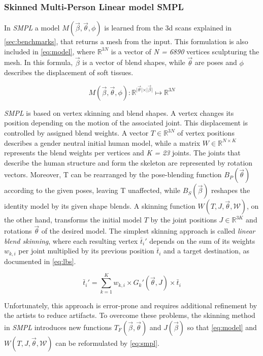 \subsubsection{Skinned Multi-Person Linear model SMPL}
In \emph{SMPL} a model $M(\vec{\beta},\vec{\theta},\phi)$ is learned from the 3d scans explained in \autoref{sec:benchmarks}, that returns a mesh from the input. This formulation is also included in \autoref{eq:model}, where $\mathbb{R}^{3N}$ is a vector of \emph{N = 6890} vertices sculpturing the mesh. In this formula, $\vec{\beta}$ is a vector of blend shapes, while $\vec{\theta}$ are poses and $\phi$ describes the displacement of soft tissues.

\begin{equation}
\label{eq:model}
M(\vec{\beta},\vec{\theta},\phi) : \mathbb{R}^{\vert \vec{\theta} \vert \times \vert \vec{\beta} \vert} \mapsto \mathbb{R}^{3N}
\end{equation}

\emph{SMPL} is based on vertex skinning and blend shapes. A vertex changes its position depending on the motion of the associated joint. This displacement is controlled by assigned blend weights. A vector $T \in \mathbb{R}^{3N}$ of vertex positions describes a gender neutral initial human model, while a matrix $W \in \mathbb{R}^{N \times K}$ represents the blend weights per vertices and \emph{K = 23} joints. The joints that describe the human structure and form the skeleton are represented by rotation vectors. Moreover, T can be rearranged by the pose-blending function $B_{P}(\vec{\theta})$ according to the given poses, leaving T unaffected, while $B_{S}(\vec{\beta})$ reshapes the identity model by its given shape blends. A skinning function $W(T,J,\vec{\theta},\mathcal{W})$, on the other hand, transforms the initial model $T$ by the joint positions $J \in \mathbb{R}^{3K}$ and rotations $\vec{\theta}$ of the desired model. The simplest skinning approach is called \emph{linear blend skinning}, where each resulting vertex $\bar{t}_{i}'$ depends on the sum of its weights $w_{k,i}$ per joint multiplied by its previous position $\bar{t}_{i}$ and a target destination, as documented in \autoref{eq:lbs}. 

\begin{equation}
\label{eq:lbs}
\bar{t}_{i}' = \sum_{k=1}^{K} w_{k,i} \times G_{k}'(\vec{\theta},J) \times \bar{t}_{i}
\end{equation}

Unfortunately, this approach is error-prone and requires additional refinement by the artists to reduce artifacts. To overcome these problems, the skinning method in \emph{SMPL} introduces new functions $T_{F}(\vec{\beta},\vec{\theta})$ and $J(\vec{\beta})$ so that \autoref{eq:model} and $W(T,J,\vec{\theta},\mathcal{W})$ can be reformulated by \autoref{eq:smpl}.

